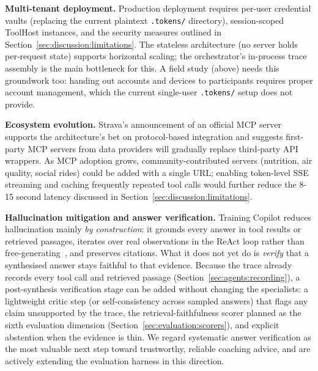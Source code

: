\textbf{Multi-tenant deployment.} Production deployment requires per-user credential vaults (replacing the current plaintext \texttt{.tokens/} directory), session-scoped ToolHost instances, and the security measures outlined in Section~\ref{sec:discussion:limitations}. The stateless architecture (no server holds per-request state) supports horizontal scaling; the orchestrator's in-process trace assembly is the main bottleneck for this. A field study (above) needs this groundwork too: handing out accounts and devices to participants requires proper account management, which the current single-user \texttt{.tokens/} setup does not provide.

\textbf{Ecosystem evolution.} Strava's announcement of an official MCP server~\citep{strava_api_update_2026} supports the architecture's bet on protocol-based integration and suggests first-party MCP servers from data providers will gradually replace third-party API wrappers. As MCP adoption grows, community-contributed servers (nutrition, air quality, social rides) could be added with a single URL; enabling token-level SSE streaming and caching frequently repeated tool calls would further reduce the 8-15 second latency discussed in Section~\ref{sec:discussion:limitations}.

\textbf{Hallucination mitigation and answer verification.} Training Copilot reduces hallucination mainly \textit{by construction}: it grounds every answer in tool results or retrieved passages, iterates over real observations in the ReAct loop rather than free-generating~\citep{yao_react_2023}, and preserves citations. What it does not yet do is \textit{verify} that a synthesised answer stays faithful to that evidence. Because the trace already records every tool call and retrieved passage (Section~\ref{sec:agents:recording}), a post-synthesis verification stage can be added without changing the specialists: a lightweight critic step (or self-consistency across sampled answers) that flags any claim unsupported by the trace, the retrieval-faithfulness scorer planned as the sixth evaluation dimension (Section~\ref{sec:evaluation:scorers}), and explicit abstention when the evidence is thin. We regard systematic answer verification as the most valuable next step toward trustworthy, reliable coaching advice, and are actively extending the evaluation harness in this direction.

